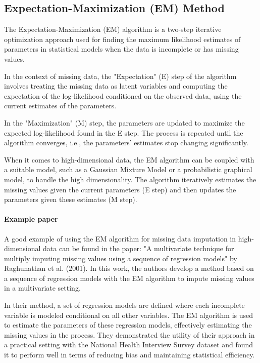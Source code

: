 \documentclass[a4paper,12pt,twoside,openright]{report}
\begin{document}
\subsection{Expectation-Maximization (EM) Method}

The Expectation-Maximization (EM) algorithm is a two-step iterative optimization approach used for finding the maximum likelihood estimates of parameters in statistical models when the data is incomplete or has missing values.

In the context of missing data, the "Expectation" (E) step of the algorithm involves treating the missing data as latent variables and computing the expectation of the log-likelihood conditioned on the observed data, using the current estimates of the parameters. 

In the "Maximization" (M) step, the parameters are updated to maximize the expected log-likelihood found in the E step. The process is repeated until the algorithm converges, i.e., the parameters' estimates stop changing significantly.

When it comes to high-dimensional data, the EM algorithm can be coupled with a suitable model, such as a Gaussian Mixture Model or a probabilistic graphical model, to handle the high dimensionality. The algorithm iteratively estimates the missing values given the current parameters (E step) and then updates the parameters given these estimates (M step).

\paragraph{Example paper} A good example of using the EM algorithm for missing data imputation in high-dimensional data can be found in the paper: "A multivariate technique for multiply imputing missing values using a sequence of regression models" by Raghunathan et al. (2001). In this work, the authors develop a method based on a sequence of regression models with the EM algorithm to impute missing values in a multivariate setting.

In their method, a set of regression models are defined where each incomplete variable is modeled conditional on all other variables. The EM algorithm is used to estimate the parameters of these regression models, effectively estimating the missing values in the process. They demonstrated the utility of their approach in a practical setting with the National Health Interview Survey dataset and found it to perform well in terms of reducing bias and maintaining statistical efficiency.
\end{document}

